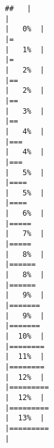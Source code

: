 \documentclass[
]{book}
\begin{document}
\begin{verbatim}
##   |                                                                              |                                                                      |   0%  |                                                                              |=                                                                     |   1%  |                                                                              |=                                                                     |   2%  |                                                                              |==                                                                    |   2%  |                                                                              |==                                                                    |   3%  |                                                                              |==                                                                    |   4%  |                                                                              |===                                                                   |   4%  |                                                                              |===                                                                   |   5%  |                                                                              |====                                                                  |   5%  |                                                                              |====                                                                  |   6%  |                                                                              |=====                                                                 |   7%  |                                                                              |=====                                                                 |   8%  |                                                                              |======                                                                |   8%  |                                                                              |======                                                                |   9%  |                                                                              |=======                                                               |   9%  |                                                                              |=======                                                               |  10%  |                                                                              |========                                                              |  11%  |                                                                              |========                                                              |  12%  |                                                                              |=========                                                             |  12%  |                                                                              |=========                                                             |  13%  |                                                                              |=========                                                             |  
\end{verbatim}
\end{document}
